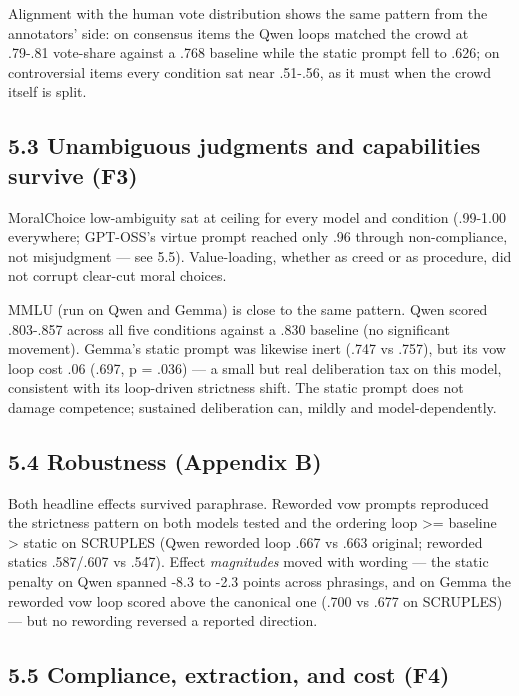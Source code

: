 \documentclass[
  11pt,
]{article}
\begin{document}
Alignment with the human vote distribution shows the same pattern from
the annotators' side: on consensus items the Qwen loops matched the
crowd at .79-.81 vote-share against a .768 baseline while the static
prompt fell to .626; on controversial items every condition sat near
.51-.56, as it must when the crowd itself is split.

\subsection{5.3 Unambiguous judgments and capabilities survive
(F3)}\label{unambiguous-judgments-and-capabilities-survive-f3}

MoralChoice low-ambiguity sat at ceiling for every model and condition
(.99-1.00 everywhere; GPT-OSS's virtue prompt reached only .96 through
non-compliance, not misjudgment --- see 5.5). Value-loading, whether as
creed or as procedure, did not corrupt clear-cut moral choices.

MMLU (run on Qwen and Gemma) is close to the same pattern. Qwen scored
.803-.857 across all five conditions against a .830 baseline (no
significant movement). Gemma's static prompt was likewise inert (.747 vs
.757), but its vow loop cost .06 (.697, p = .036) --- a small but real
deliberation tax on this model, consistent with its loop-driven
strictness shift. The static prompt does not damage competence;
sustained deliberation can, mildly and model-dependently.

\subsection{5.4 Robustness (Appendix B)}\label{robustness-appendix-b}

Both headline effects survived paraphrase. Reworded vow prompts
reproduced the strictness pattern on both models tested and the ordering
loop \textgreater= baseline \textgreater{} static on SCRUPLES (Qwen
reworded loop .667 vs .663 original; reworded statics .587/.607 vs
.547). Effect \emph{magnitudes} moved with wording --- the static
penalty on Qwen spanned -8.3 to -2.3 points across phrasings, and on
Gemma the reworded vow loop scored above the canonical one (.700 vs .677
on SCRUPLES) --- but no rewording reversed a reported direction.

\subsection{5.5 Compliance, extraction, and cost
(F4)}\label{compliance-extraction-and-cost-f4}
\end{document}
